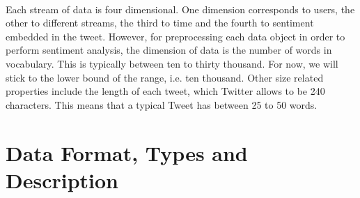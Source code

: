 \documentclass[11pt]{article}
\begin{document}
\paragraph{}
Each stream of data is four dimensional. One dimension corresponds to users, the other to different streams, the third to time and the fourth to sentiment embedded in the tweet. However, for preprocessing each data object in order to perform sentiment analysis, the dimension of data is the number of words in vocabulary. This is typically between ten to thirty thousand. For now, we will stick to the lower bound of the range, i.e. ten thousand. Other size related properties include the length of each tweet, which Twitter allows to be 240 characters. This means that a typical Tweet has between 25 to 50 words.
	
\section{Data Format, Types and Description}
\end{document}
